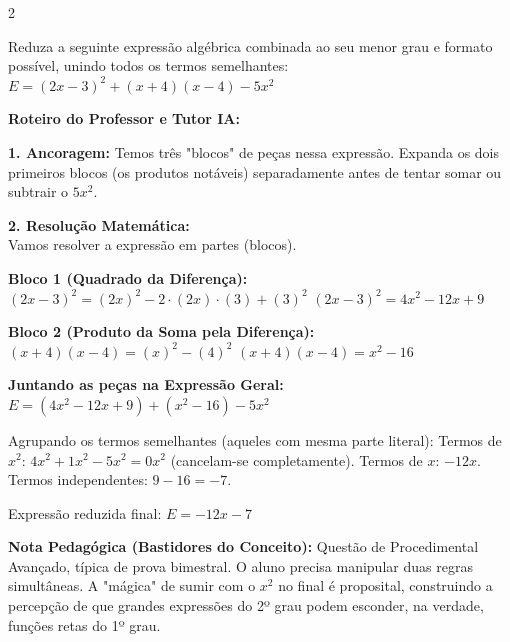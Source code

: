 \begin{multicols*}{2}
\begin{enunciadoLiteral}
Reduza a seguinte expressão algébrica combinada ao seu menor grau e formato possível, unindo todos os termos semelhantes:
$ E = (2x - 3)^2 + (x + 4)(x - 4) - 5x^2 $
\end{enunciadoLiteral}

\ifgabarito
    \begin{tcolorbox}[colback=CorTitUm!5, colframe=CorTitUm, boxrule=1pt, arc=4pt, left=6pt, right=6pt, top=6pt, bottom=6pt]
    \small\textbf{\textcolor{CorTitUm}{Roteiro do Professor e Tutor IA:}}\par\vspace{0.1cm}
    \color{CinzaEscuro}
    \textbf{1. Ancoragem:} Temos três "blocos" de peças nessa expressão. Expanda os dois primeiros blocos (os produtos notáveis) separadamente antes de tentar somar ou subtrair o $5x^2$.\par\vspace{0.1cm}
    \textbf{2. Resolução Matemática:}\\
    Vamos resolver a expressão em partes (blocos).
    
    \textbf{Bloco 1 (Quadrado da Diferença):}
    $ (2x - 3)^2 = (2x)^2 - 2 \cdot (2x) \cdot (3) + (3)^2 $
    $ (2x - 3)^2 = 4x^2 - 12x + 9 $
    
    \textbf{Bloco 2 (Produto da Soma pela Diferença):}
    $ (x + 4)(x - 4) = (x)^2 - (4)^2 $
    $ (x + 4)(x - 4) = x^2 - 16 $
    
    \textbf{Juntando as peças na Expressão Geral:}
    $ E = (4x^2 - 12x + 9) + (x^2 - 16) - 5x^2 $
    
    Agrupando os termos semelhantes (aqueles com mesma parte literal):
    Termos de $x^2$: $ 4x^2 + 1x^2 - 5x^2 = 0x^2 $ (cancelam-se completamente).
    Termos de $x$: $ -12x $.
    Termos independentes: $ 9 - 16 = -7 $.
    
    Expressão reduzida final:
    $ E = -12x - 7 $
    \end{tcolorbox}
    \vspace{0.15cm}
    
    \begin{boxexplicacao}
    \textbf{Nota Pedagógica (Bastidores do Conceito):} Questão de Procedimental Avançado, típica de prova bimestral. O aluno precisa manipular duas regras simultâneas. A "mágica" de sumir com o $x^2$ no final é proposital, construindo a percepção de que grandes expressões do 2º grau podem esconder, na verdade, funções retas do 1º grau.
    \end{boxexplicacao}
\fi


\end{multicols*}
